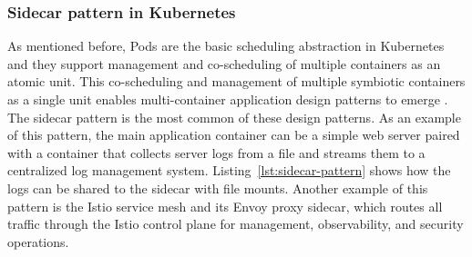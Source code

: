 \documentclass[english, 12pt, a4paper, sci, utf8, a-2b, online]{aaltothesis}
\begin{document}
\subsubsection{Sidecar pattern in Kubernetes}

As mentioned before, Pods are the basic scheduling abstraction in Kubernetes and they support management and co-scheduling of multiple containers as an atomic unit.
This co-scheduling and management of multiple symbiotic containers as a single unit enables multi-container application design patterns to emerge \cite{burns2016design}.
The sidecar pattern is the most common of these design patterns.
As an example of this pattern, the main application container can be a simple web server paired with a container that collects server logs from a file and streams them to a centralized log management system.
Listing~\ref{lst:sidecar-pattern} shows how the logs can be shared to the sidecar with file mounts.
Another example of this pattern is the Istio service mesh \cite{istio} and its Envoy proxy sidecar, which routes all traffic through the Istio control plane for management, observability, and security operations.



\end{document}

